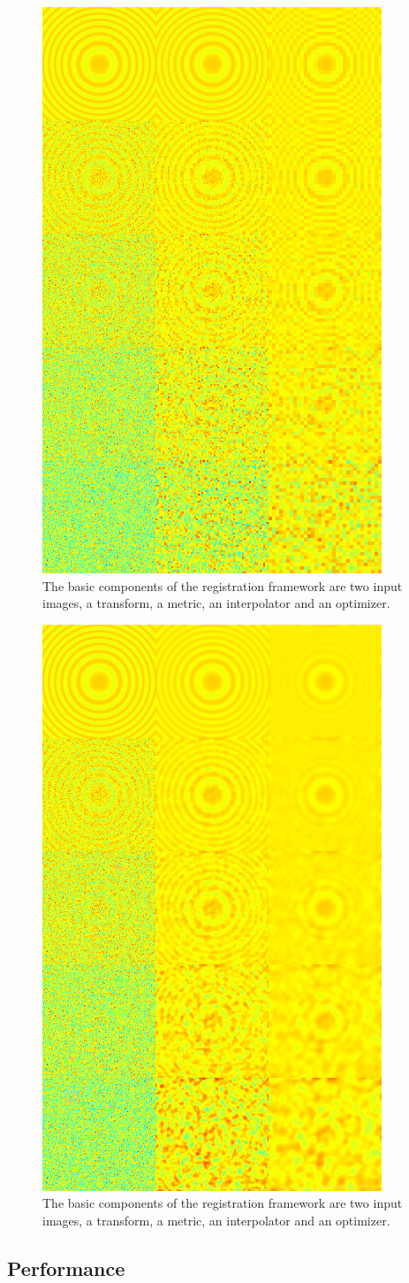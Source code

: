 \documentclass{InsightArticle}
\begin{document}
\begin{figure}
  \centering
  \includegraphics[width=0.4\linewidth]{images/binshrink_hot.png}
  \caption[Registration Framework Components]{The basic components of the
    registration framework are two input images, a transform, a metric, an
    interpolator and an optimizer.}
  \label{fig:BinShrinkComparison}
\end{figure}

\begin{figure}
  \centering
  \includegraphics[width=0.4\linewidth]{images/gaussianshrink_hot.png}
  \caption[Registration Framework Components]{The basic components of the
    registration framework are two input images, a transform, a metric, an
    interpolator and an optimizer.}
  \label{fig:GaussianShrinkComparison}
\end{figure}

\subsection{Performance}
\end{document}
